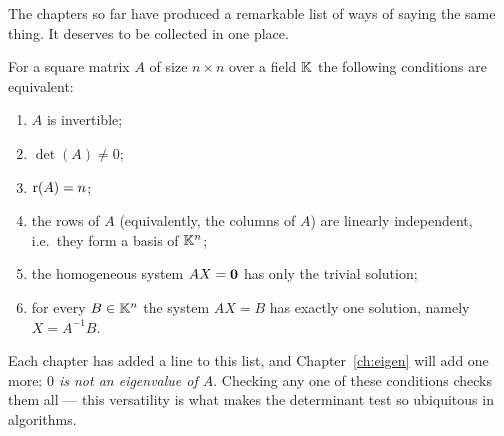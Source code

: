 The chapters so far have produced a remarkable list of ways of saying the same thing. It deserves to be
collected in one place.

\begin{theorem}
For a square matrix $A$ of size $n\times n$ over a field $\mathbb{K}$ the following conditions are equivalent:
\begin{enumerate}
\item $A$ is invertible;
\item $\det(A)\neq 0$;
\item $\operatorname{r}(A) = n$;
\item the rows of $A$ (equivalently, the columns of $A$) are linearly independent, i.e.\ they form a basis
of $\mathbb{K}^n$;
\item the homogeneous system $AX = \mathbf{0}$ has only the trivial solution;
\item for every $B\in\mathbb{K}^n$ the system $AX = B$ has exactly one solution, namely $X = A^{-1}B$.
\end{enumerate}
\end{theorem}

\begin{remark}
Each chapter has added a line to this list, and Chapter~\ref{ch:eigen} will add one more: \emph{$0$ is not
an eigenvalue of $A$}. Checking any one of these conditions checks them all — this versatility is what
makes the determinant test so ubiquitous in algorithms.
\end{remark}
